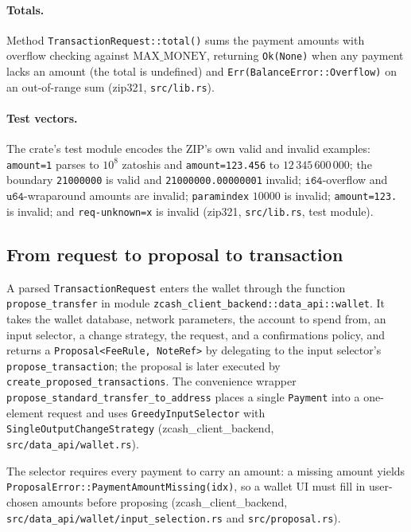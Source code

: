 \documentclass[11pt,a4paper]{article}
\theoremstyle{definition}
\begin{document}
\paragraph{Totals.} Method \texttt{TransactionRequest::total()} sums the
payment amounts with overflow checking against $\mathrm{MAX\_MONEY}$,
returning \texttt{Ok(None)} when any payment lacks an amount (the total is
undefined) and \texttt{Err(BalanceError::Overflow)} on an out-of-range sum
(\textsf{zip321}, \texttt{src/lib.rs}).

\paragraph{Test vectors.} The crate's test module encodes the ZIP's own
valid and invalid examples: \texttt{amount=1} parses to $10^{8}$ zatoshis
and \texttt{amount=123.456} to $12\,345\,600\,000$; the boundary
\texttt{21000000} is valid and \texttt{21000000.00000001} invalid;
$\mathtt{i64}$-overflow and $\mathtt{u64}$-wraparound amounts are invalid;
\texttt{paramindex} $10000$ is invalid; \texttt{amount=123.} is invalid; and
\texttt{req-unknown=x} is invalid (\textsf{zip321}, \texttt{src/lib.rs},
test module).

\subsection{From request to proposal to transaction}\label{sec:zip321-consume}

A parsed \texttt{TransactionRequest} enters the wallet through the function
\texttt{propose\_transfer} in module
\texttt{zcash\_client\_backend::data\_api::wallet}. It takes the wallet
database, network parameters, the account to spend from, an input selector,
a change strategy, the request, and a confirmations policy, and returns a
\texttt{Proposal<FeeRule, NoteRef>} by delegating to the input selector's
\texttt{propose\_transaction}; the proposal is later executed by
\texttt{create\_proposed\_transactions}. The convenience wrapper
\texttt{propose\_standard\_transfer\_to\_address} places a single
\texttt{Payment} into a one-element request and uses
\texttt{GreedyInputSelector} with \texttt{SingleOutputChangeStrategy}
(\textsf{zcash\_client\_backend}, \texttt{src/data\_api/wallet.rs}).

The selector requires every payment to carry an amount: a missing amount
yields \texttt{ProposalError::PaymentAmountMissing(idx)}, so a wallet UI
must fill in user-chosen amounts before proposing
(\textsf{zcash\_client\_backend},
\texttt{src/data\_api/wallet/input\_selection.rs} and
\texttt{src/proposal.rs}).
\end{document}
